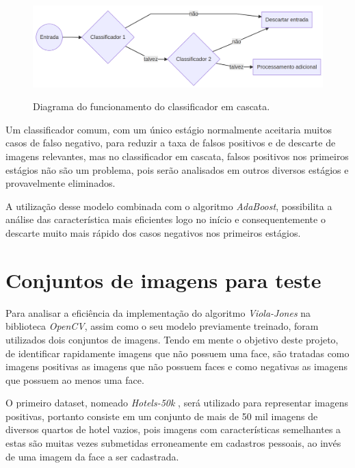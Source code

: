 \begin{figure}[htb]
    \centering
    \caption{Diagrama do funcionamento do classificador em cascata.}
    \includegraphics[scale=.2]{figs/cascade-classifier.png}
    \label{fig:cascade-classifier}
 \end{figure}

 Um classificador comum, com um único estágio normalmente aceitaria muitos casos de falso negativo, para reduzir a taxa de falsos positivos e de descarte de imagens relevantes, mas no classificador em cascata, falsos positivos nos primeiros estágios não são um problema, pois serão analisados em outros diversos estágios e provavelmente eliminados.

 A utilização desse modelo combinada com o algoritmo \textit{AdaBoost}, possibilita a análise das característica mais eficientes logo no início e consequentemente o descarte muito mais rápido dos casos negativos nos primeiros estágios.

 \section{Conjuntos de imagens para teste}

 Para analisar a eficiência da implementação do algoritmo \textit{Viola-Jones} na biblioteca \textit{OpenCV}, assim como o seu modelo previamente treinado, foram utilizados dois conjuntos de imagens. Tendo em mente o objetivo deste projeto, de identificar rapidamente imagens que não possuem uma face, são tratadas como imagens positivas as imagens que não possuem faces e como negativas as imagens que possuem ao menos uma face.

O primeiro dataset, nomeado \textit{Hotels-50k} \cite{hotels50k-article}, será utilizado para representar imagens positivas, portanto consiste em um conjunto de mais de 50 mil imagens de diversos quartos de hotel vazios, pois imagens com características semelhantes a estas são muitas vezes submetidas erroneamente em cadastros pessoais, ao invés de uma imagem da face a ser cadastrada.

